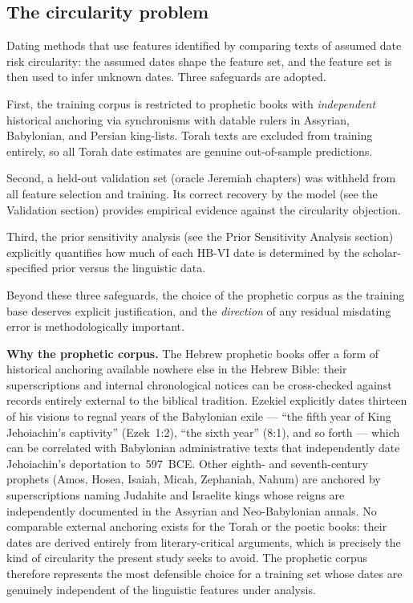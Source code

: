 \documentclass[10pt,letterpaper]{article}
\newcommand{\hbvi}{HB-VI}
\begin{document}
\subsection*{The circularity problem}

Dating methods that use features identified by comparing texts of assumed
date risk circularity: the assumed dates shape the feature set, and the
feature set is then used to infer unknown dates.  Three safeguards are
adopted.

First, the training corpus is restricted to prophetic books with
\emph{independent} historical anchoring via synchronisms with datable
rulers in Assyrian, Babylonian, and Persian king-lists.  Torah texts
are excluded from training entirely, so all Torah date estimates are
genuine out-of-sample predictions.

Second, a held-out validation set (oracle Jeremiah chapters) was
withheld from all feature selection and training.  Its correct recovery by
the model (see the Validation section) provides empirical evidence against
the circularity objection.

Third, the prior sensitivity analysis (see the Prior Sensitivity Analysis
section) explicitly quantifies
how much of each \hbvi{} date is determined by the scholar-specified
prior versus the linguistic data.

Beyond these three safeguards, the choice of the prophetic corpus as the
training base deserves explicit justification, and the \emph{direction} of
any residual misdating error is methodologically important.

\textbf{Why the prophetic corpus.}
The Hebrew prophetic books offer a form of historical anchoring available
nowhere else in the Hebrew Bible: their superscriptions and internal
chronological notices can be cross-checked against records entirely external
to the biblical tradition.  Ezekiel explicitly dates thirteen of his visions
to regnal years of the Babylonian exile --- ``the fifth year of King
Jehoiachin's captivity'' (Ezek~1:2), ``the sixth year'' (8:1), and so
forth --- which can be correlated with Babylonian administrative texts that
independently date Jehoiachin's deportation to~597~BCE.  Other eighth-
and seventh-century prophets (Amos, Hosea, Isaiah, Micah, Zephaniah,
Nahum) are anchored by superscriptions naming Judahite and Israelite kings
whose reigns are independently documented in the Assyrian and
Neo-Babylonian annals.  No comparable external anchoring exists for the
Torah or the poetic books: their dates are derived entirely from
literary-critical arguments, which is precisely the kind of circularity the
present study seeks to avoid.  The prophetic corpus therefore represents
the most defensible choice for a training set whose dates are genuinely
independent of the linguistic features under analysis.
\end{document}
